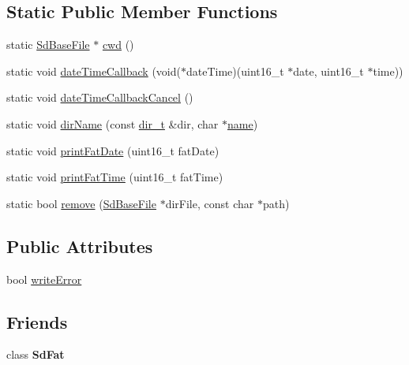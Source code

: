 \subsection*{Static Public Member Functions}
\begin{DoxyCompactItemize}
\item 
static \hyperlink{class_sd_base_file}{Sd\+Base\+File} $\ast$ \hyperlink{class_sd_base_file_a56b9402969b3348c97b413750226f955}{cwd} ()
\item 
static void \hyperlink{class_sd_base_file_a1664a62726dcd7ff82c12d724b3b34df}{date\+Time\+Callback} (void($\ast$date\+Time)(uint16\+\_\+t $\ast$date, uint16\+\_\+t $\ast$time))
\item 
static void \hyperlink{class_sd_base_file_a04e3e7829c56a6b11df8df0051a49ef9}{date\+Time\+Callback\+Cancel} ()
\item 
static void \hyperlink{class_sd_base_file_a8fdbf7893bf19793e772b340e4c08fed}{dir\+Name} (const \hyperlink{_sd_fat_structs_8h_a803db59d4e16a0c54a647afc6a7954e3}{dir\+\_\+t} \&dir, char $\ast$\hyperlink{_sd_fat_structs_8h_a30308c9b983377042fd2cc8900454fb1}{name})
\item 
static void \hyperlink{class_sd_base_file_a1f8b53aea38427dd483dfff4e9437d0c}{print\+Fat\+Date} (uint16\+\_\+t fat\+Date)
\item 
static void \hyperlink{class_sd_base_file_a9d7dcf89a8d3144731e59ea74a640d68}{print\+Fat\+Time} (uint16\+\_\+t fat\+Time)
\item 
static bool \hyperlink{class_sd_base_file_a4951400870f3f5ed8cc3f46b69388ed7}{remove} (\hyperlink{class_sd_base_file}{Sd\+Base\+File} $\ast$dir\+File, const char $\ast$path)
\end{DoxyCompactItemize}
\subsection*{Public Attributes}
\begin{DoxyCompactItemize}
\item 
bool \hyperlink{class_sd_base_file_a47d4ba2177ffcd99c2387f9fac182d5b}{write\+Error}
\end{DoxyCompactItemize}
\subsection*{Friends}
\begin{DoxyCompactItemize}
\item 
class {\bfseries Sd\+Fat}\hypertarget{class_sd_base_file_ac838f1e6beb01ec57bd4b52e57df85e7}{}\label{class_sd_base_file_ac838f1e6beb01ec57bd4b52e57df85e7}

\end{DoxyCompactItemize}


